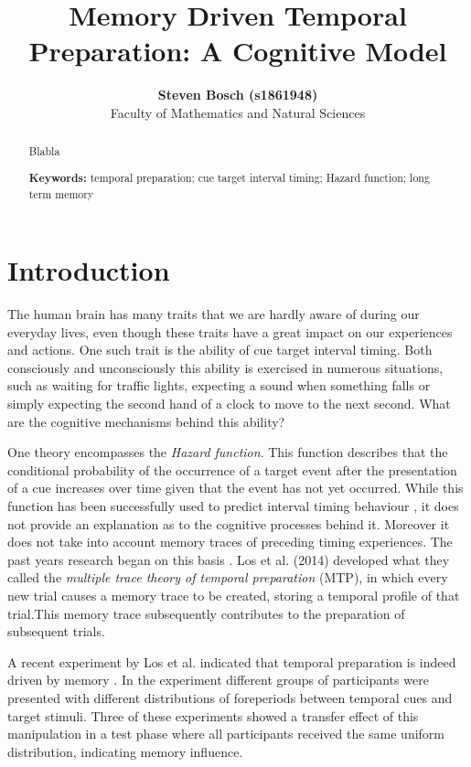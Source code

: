 \documentclass[10pt,letterpaper]{article}
\title{Memory Driven Temporal Preparation: A Cognitive Model}
\author{{\large \bf Steven Bosch (s1861948)} \\
  Faculty of Mathematics and Natural Sciences}
\begin{document}
\maketitle

\begin{abstract}
Blabla

\textbf{Keywords:} 
temporal preparation; cue target interval timing; Hazard function; long term memory
\end{abstract}

\section{Introduction}
The human brain has many traits that we are hardly aware of during our everyday lives, even though these traits have a great impact on our experiences and actions. One such trait is the ability of cue target interval timing. Both consciously and unconsciously this ability is exercised in numerous situations, such as waiting for traffic lights, expecting a sound when something falls or simply expecting the second hand of a clock to move to the next second. What are the cognitive mechanisms behind this ability?

One theory encompasses the \textit{Hazard function}. This function describes that the conditional probability of the occurrence of a target event after the presentation of a cue increases over time given that the event has not yet occurred. While this function has been successfully used to predict interval timing behaviour \cite{Nobre, Vangkilde}, it does not provide an explanation as to the cognitive processes behind it. Moreover it does not take into account memory traces of preceding timing experiences. The past years research began on this basis \cite{Los1, Howard, Taatgen}. Los et al. (2014) developed what they called the \textit{multiple trace theory of temporal preparation} (MTP), in which every new trial causes a memory trace to be created, storing a temporal profile of that trial.This memory trace subsequently contributes to the preparation of subsequent trials. 

A recent experiment by Los et al. indicated that temporal preparation is indeed driven by memory \cite{Los2}. In the experiment different groups of participants were presented with different distributions of foreperiods between temporal cues and target stimuli. Three of these experiments showed a transfer effect of this manipulation in a test phase where all participants received the same uniform distribution, indicating memory influence. 
\end{document}
